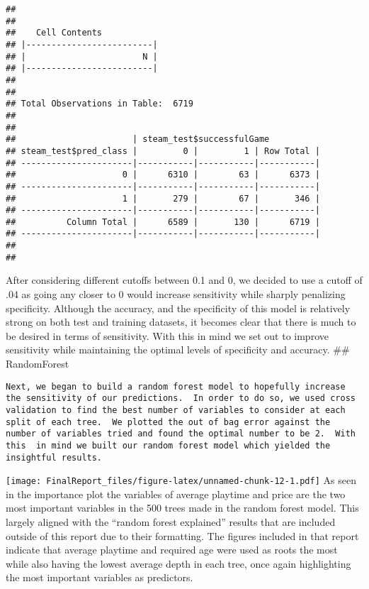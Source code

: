 \documentclass[]{article}
\begin{document}
\begin{verbatim}
## 
##  
##    Cell Contents
## |-------------------------|
## |                       N |
## |-------------------------|
## 
##  
## Total Observations in Table:  6719 
## 
##  
##                       | steam_test$successfulGame 
## steam_test$pred_class |         0 |         1 | Row Total | 
## ----------------------|-----------|-----------|-----------|
##                     0 |      6310 |        63 |      6373 | 
## ----------------------|-----------|-----------|-----------|
##                     1 |       279 |        67 |       346 | 
## ----------------------|-----------|-----------|-----------|
##          Column Total |      6589 |       130 |      6719 | 
## ----------------------|-----------|-----------|-----------|
## 
## 
\end{verbatim}

After considering different cutoffs between 0.1 and 0, we decided to use
a cutoff of .04 as going any closer to 0 would increase sensitivity
while sharply penalizing specificity. Although the accuracy, and the
specificity of this model is relatively strong on both test and training
datasets, it becomes clear that there is much to be desired in terms of
sensitivity. With this in mind we set out to improve sensitivity while
maintaining the optimal levels of specificity and accuracy. \#\#
RandomForest

\begin{verbatim}
Next, we began to build a random forest model to hopefully increase the sensitivity of our predictions.  In order to do so, we used cross validation to find the best number of variables to consider at each split of each tree.  We plotted the out of bag error against the number of variables tried and found the optimal number to be 2.  With this  in mind we built our random forest model which yielded the insightful results.
\end{verbatim}

\texttt{[image: FinalReport\_files/figure-latex/unnamed-chunk-12-1.pdf]}
As seen in the importance plot the variables of average playtime and
price are the two most important variables in the 500 trees made in the
random forest model. This largely aligned with the ``random forest
explained'' results that are included outside of this report due to
their formatting. The figures included in that report indicate that
average playtime and required age were used as roots the most while also
having the lowest average depth in each tree, once again highlighting
the most important variables as predictors.
\end{document}
